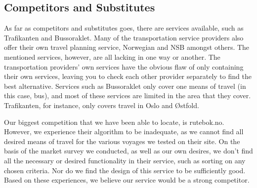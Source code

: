 \subsection{Competitors and Substitutes}

As far as competitors and substitutes goes, there are services available, such as Trafikanten and Bussoraklet. Many of the transportation service providers also offer their own travel planning service, Norwegian and NSB amongst others. The mentioned services, however, are all lacking in one way or another. The transportation providers' own services have the obvious flaw of only containing their own services, leaving you to check each other provider separately to find the best alternative. Services such as Bussoraklet only cover one means of travel (in this case, bus), and most of these services are limited in the area that they cover. Trafikanten, for instance, only covers travel in Oslo and Østfold.

Our biggest competition that we have been able to locate, is rutebok.no. However, we experience their algorithm to be inadequate, as we cannot find all desired means of travel for the various voyages we tested on their site. On the basis of the market survey we conducted, as well as our own desires, we don't find all the necessary or desired functionality in their service, such as sorting on any chosen criteria. Nor do we find the design of this service to be sufficiently good. Based on these experiences, we believe our service would be a strong competitor.
